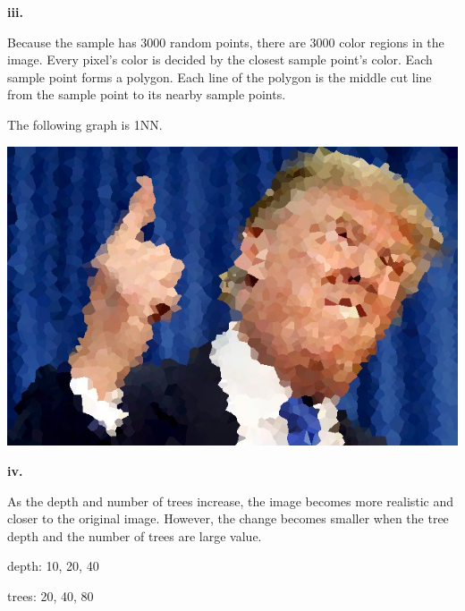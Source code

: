 \documentclass[12pt]{article}
\begin{document}
{\medskip
\textbf{iii.}

Because the sample has 3000 random points, there are 3000 color regions in the image. Every pixel's color is decided by the closest sample point's color. Each sample point forms a polygon. Each line of the polygon is the middle cut line from the sample point to its nearby sample points.

\medskip
The following graph is 1NN.

\includegraphics[scale=0.2]{P1/1NN_Trump.jpg}

\medskip
\textbf{iv.}

As the depth and number of trees increase, the image becomes more realistic and closer to the original image. However, the change becomes smaller when the tree depth and the number of trees are large value.

depth: 10, 20, 40

trees: 20, 40, 80

}
\end{document}
